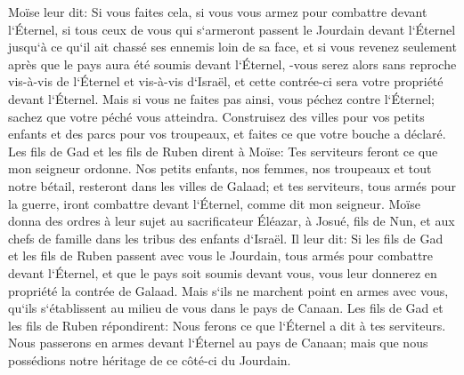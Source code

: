 \verse Moïse leur dit: Si vous faites cela, si vous vous armez pour combattre devant l`Éternel, 
\verse si tous ceux de vous qui s`armeront passent le Jourdain devant l`Éternel jusqu`à ce qu`il ait chassé ses ennemis loin de sa face, 
\verse et si vous revenez seulement après que le pays aura été soumis devant l`Éternel, -vous serez alors sans reproche vis-à-vis de l`Éternel et vis-à-vis d`Israël, et cette contrée-ci sera votre propriété devant l`Éternel. 
\verse Mais si vous ne faites pas ainsi, vous péchez contre l`Éternel; sachez que votre péché vous atteindra. 
\verse Construisez des villes pour vos petits enfants et des parcs pour vos troupeaux, et faites ce que votre bouche a déclaré. 
\verse Les fils de Gad et les fils de Ruben dirent à Moïse: Tes serviteurs feront ce que mon seigneur ordonne. 
\verse Nos petits enfants, nos femmes, nos troupeaux et tout notre bétail, resteront dans les villes de Galaad; 
\verse et tes serviteurs, tous armés pour la guerre, iront combattre devant l`Éternel, comme dit mon seigneur. 
\verse Moïse donna des ordres à leur sujet au sacrificateur Éléazar, à Josué, fils de Nun, et aux chefs de famille dans les tribus des enfants d`Israël. 
\verse Il leur dit: Si les fils de Gad et les fils de Ruben passent avec vous le Jourdain, tous armés pour combattre devant l`Éternel, et que le pays soit soumis devant vous, vous leur donnerez en propriété la contrée de Galaad. 
\verse Mais s`ils ne marchent point en armes avec vous, qu`ils s`établissent au milieu de vous dans le pays de Canaan. 
\verse Les fils de Gad et les fils de Ruben répondirent: Nous ferons ce que l`Éternel a dit à tes serviteurs. 
\verse Nous passerons en armes devant l`Éternel au pays de Canaan; mais que nous possédions notre héritage de ce côté-ci du Jourdain. 
